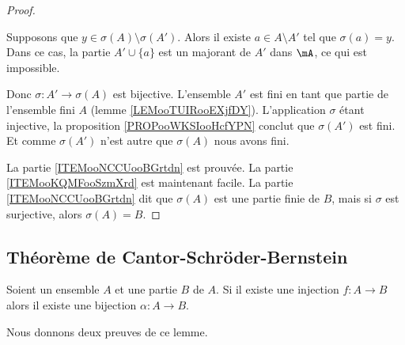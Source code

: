 \begin{proof}
\begin{subproof}
		Supposons que \( y\in\sigma(A)\setminus\sigma(A')\). Alors il existe \( a\in A\setminus A'\) tel que \( \sigma(a)=y\). Dans ce cas, la partie \( A'\cup\{ a \}\) est un majorant de \( A'\) dans \( \mA\), ce qui est impossible.

		Donc \( \sigma\colon A'\to \sigma(A)\) est bijective.
		\spitem[Conclusion]
		L'ensemble \( A'\) est fini en tant que partie de l'ensemble fini \( A\) (lemme \ref{LEMooTUIRooEXjfDY}). L'application \( \sigma\) étant injective, la proposition \ref{PROPooWKSIooHcfYPN} conclut que \( \sigma(A')\) est fini. Et comme \( \sigma(A')\) n'est autre que \( \sigma(A)\) nous avons fini.
	\end{subproof}
	La partie \ref{ITEMooNCCUooBGrtdn} est prouvée. La partie \ref{ITEMooKQMFooSzmXrd} est maintenant facile. La partie \ref{ITEMooNCCUooBGrtdn} dit que \( \sigma(A)\) est une partie finie de \( B\), mais si \( \sigma\) est surjective, alors \( \sigma(A)=B\).
\end{proof}


\subsection{Théorème de Cantor-Schröder-Bernstein}
\label{SUBooCantorSchroderBernstein}

\begin{lemma}     \label{LEMooTNMHooBpdzab}
	Soient un ensemble \( A\) et une partie \( B\) de \( A\). Si il existe une injection \( f\colon A\to B\) alors il existe une bijection \( \alpha\colon A\to B\).
\end{lemma}

Nous donnons deux preuves de ce lemme.

